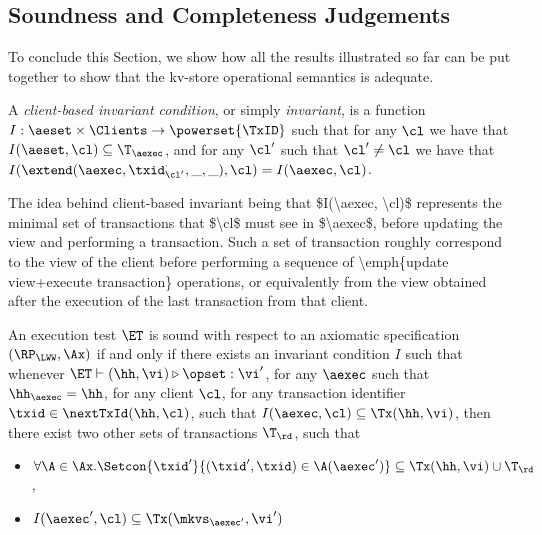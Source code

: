 \subsection{Soundness and Completeness Judgements}

To conclude this Section, we show how all the results illustrated so far 
can be put together to show that the kv-store operational semantics is adequate. 
\begin{definition}
A \emph{client-based invariant condition}, or simply \emph{invariant}, is a 
function $I : \aeset \times \Clients \rightarrow \powerset{\TxID}$ 
such that for any $\cl$ we have that $I(\aeset, \cl) \subseteq \T_{\aexec}$, and 
for any  $\cl'$ such that $\cl' \neq \cl$ we have that 
$I(\extend(\aexec, \txid_{\cl'}^{\cdot}, \_, \_), \cl) = I(\aexec, \cl)$.
\end{definition}
\ac{The idea behind client-based invariant being that $I(\aexec, \cl)$ represents 
the minimal set of transactions that $\cl$ must see in $\aexec$, before 
updating the view and performing a transaction. Such a set of transaction 
roughly correspond to the view of the client before performing a 
sequence of \emph{update view+execute transaction} operations, 
or equivalently from the view obtained after the execution of the 
last transaction from that client.}


\begin{definition}
\label{def:et_sound}
An execution test $\ET$ is sound with respect to an axiomatic 
specification $(\RP_{\LWW}, \Ax)$ if and only if there exists an 
invariant condition $I$ such that whenever $\ET \vdash (\hh, \vi) 
\triangleright \opset: \vi'$, for any $\aexec$ such that 
$\hh_{\aexec} = \hh$, for any client $\cl$, for any 
transaction identifier $\txid \in \nextTxId(\hh, \cl)$, 
such that  $I(\aexec, \cl) \subseteq \Tx(\hh, \vi)$, then  
there exist two other sets of transactions $\T_{\rd}$, 
such that 
\begin{itemize}
\item $\forall \A \in \Ax. \Setcon{\txid' }{ (\txid', \txid) \in \A(\aexec')} \subseteq \Tx(\hh, \vi) \cup \T_{\rd}$, 
\item $I(\aexec', \cl) \subseteq \Tx(\mkvs_{\aexec'}, \vi')$
\end{itemize}
\end{definition}

